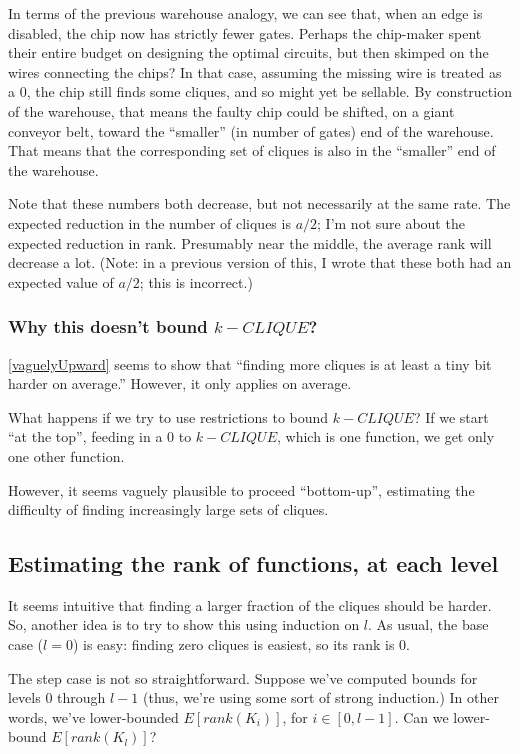 \documentclass[12pt]{article}
\theoremstyle{definition}
\begin{document}
In terms of the previous warehouse analogy, we can see that,
when an edge is disabled, the chip now has strictly fewer gates.
Perhaps the chip-maker spent their entire budget on designing the
optimal circuits, but then skimped on the wires connecting the chips?
In that case, assuming the missing wire is treated as a 0, the chip still
finds some cliques, and so might yet be sellable.
By construction of the warehouse, that means the faulty chip could be shifted,
on a giant conveyor belt,
toward the ``smaller'' (in number of gates) end of the warehouse.
That means that the corresponding set of cliques is also
in the ``smaller'' end of the warehouse.

Note that these numbers both decrease, but not necessarily at the same rate.
The expected reduction in the number of cliques is $a/2$; I'm not sure
about the expected reduction in rank. Presumably near the middle, the
average rank will decrease a lot.
(Note: in a previous version of this, I wrote that these both had an expected
value of $a/2$; this is incorrect.)

\subsubsection{Why this doesn't bound $k-CLIQUE$?}

\ref{vaguelyUpward} seems to show that ``finding more cliques is
at least a tiny bit harder on average.'' However, it only applies
on average.

What happens if we try to use restrictions to bound $k-CLIQUE$?
If we start ``at the top'',
feeding in a 0 to $k-CLIQUE$, which is one function,
we get only one other function.

However, it seems vaguely plausible to proceed ``bottom-up'',
estimating the difficulty of finding increasingly large
sets of cliques.

\subsection{Estimating the rank of functions, at each level}

It seems intuitive that finding a larger fraction of the cliques
should be harder.
So, another idea is to try to show this using induction on $l$.
As usual, the base case ($l=0$) is easy: finding zero cliques is easiest,
so its rank is 0.

The step case is not so straightforward. Suppose we've computed bounds for
levels 0 through $l-1$ (thus, we're using some sort of strong induction.)
In other words, we've lower-bounded $E[rank(K_i)]$, for $i \in [0,l-1]$.
Can we lower-bound $E[rank(K_l)]$?
\end{document}
